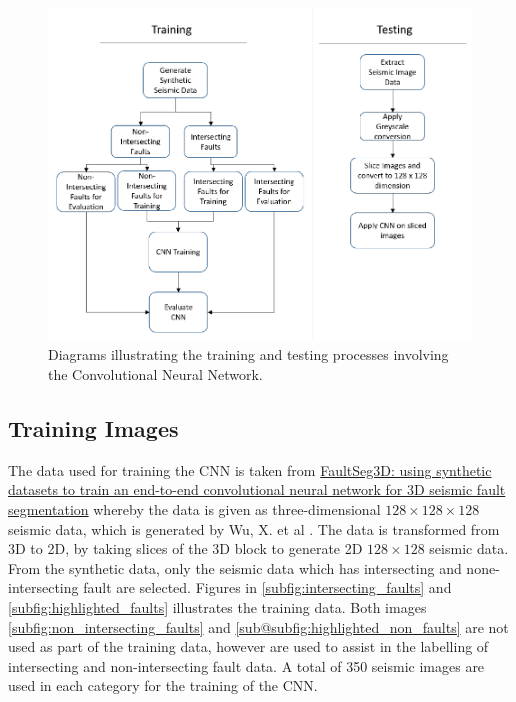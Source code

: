 \documentclass[preprint,12pt]{elsarticle}
\begin{document}
\begin{figure}[h]
    \centering
    \includegraphics[scale=0.7]{images/system_processes.png}
    \caption{Diagrams illustrating the training and testing processes involving the
        Convolutional Neural Network.}
    \label{fig:system_processes}
\end{figure}

\subsection{Training Images}
The data used for training the CNN is taken from
\href{https://github.com/xinwucwp/faultSeg}{FaultSeg3D: using synthetic datasets to
    train an end-to-end convolutional neural network for 3D seismic fault segmentation}
whereby the data is given as three-dimensional $128 \times 128 \times 128$
seismic data, which is generated by Wu, X. et al \cite{wu2019faultseg3d}. The data is transformed
from 3D to 2D, by taking slices of the 3D block to generate 2D $128 \times 128$
seismic data. From the synthetic data, only the seismic data which has
intersecting and none-intersecting fault are selected. Figures in  \ref{subfig:intersecting_faults}
and \ref{subfig:highlighted_faults} illustrates the training data.
Both images \ref{subfig:non_intersecting_faults} and \ref{sub@subfig:highlighted_non_faults} are not used as part
of the training data, however are used to assist in the labelling of intersecting
and non-intersecting fault data. A total of 350 seismic images are used in
each category for the training of the CNN.
\end{document}
